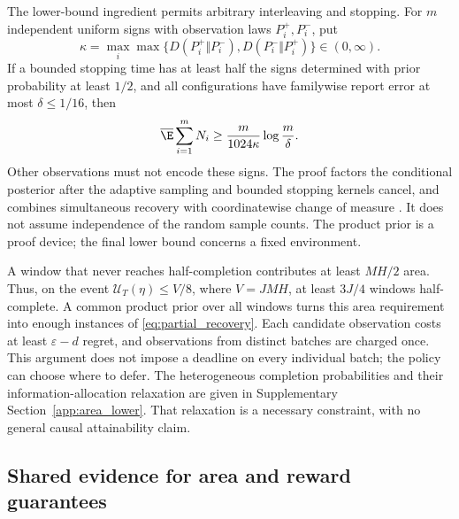 The lower-bound ingredient permits arbitrary interleaving and stopping. For
$m$ independent uniform signs with observation laws $P_i^+,P_i^-$, put
\[
 \kappa=\max_i\max\{D(P_i^+\Vert P_i^-),D(P_i^-\Vert P_i^+)\}
                                                    \in(0,\infty).
\]
If a bounded stopping time has at least half the signs determined with prior
probability at least $1/2$, and all configurations have familywise report
error at most $\delta\le1/16$, then
\begin{equation}
 \overline\E\sum_{i=1}^mN_i\ge
                 \frac{m}{1024\kappa}\log\frac m\delta.
 \label{eq:partial_recovery}
\end{equation}
Other observations must not encode these signs. The proof factors the
conditional posterior after the adaptive sampling and bounded stopping
kernels cancel, and combines simultaneous recovery with coordinatewise
change of measure \citep{kaufmann2016}. It does not assume independence of
the random sample counts. The product prior is a proof device; the final
lower bound concerns a fixed environment.

A window that never reaches half-completion contributes at least $MH/2$
area. Thus, on the event $\mathcal U_T(\eta)\le V/8$, where $V=JMH$, at
least $3J/4$ windows half-complete. A common product prior over all windows
turns this area requirement into enough instances of
\eqref{eq:partial_recovery}. Each candidate observation costs at least
$\varepsilon-d$ regret, and observations from distinct batches are charged
once. This argument does not impose a deadline on every individual batch;
the policy can choose where to defer. The heterogeneous completion
probabilities and their information-allocation relaxation are given in
Supplementary Section~\ref{app:area_lower}. That relaxation is a necessary
constraint, with no general causal attainability claim.

\subsection{Shared evidence for area and reward guarantees}

